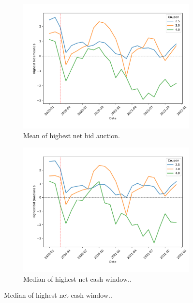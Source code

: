 \documentclass[11pt,a4paper]{article}
\begin{document}
\begin{figure}[]
\begin{subfigure}[b]{0.49\textwidth}
      \includegraphics[width=0.998\textwidth]{../results/figures/winner_bid_mean_mat30_loan1_timeseries_cpmonthly_2.5_4_cash_window_netbid.pdf}
      \caption{ Mean of highest net bid auction.}
     \end{subfigure}
     \begin{subfigure}[b]{0.49\textwidth}
      \includegraphics[width=0.998\textwidth]{../results/figures/winner_bid_median_mat30_loan1_timeseries_cpmonthly_2.5_4_cash_window_netbid.pdf}
      \caption{ Median of highest net cash window..}
     \end{subfigure}

\end{figure}
\end{document}
